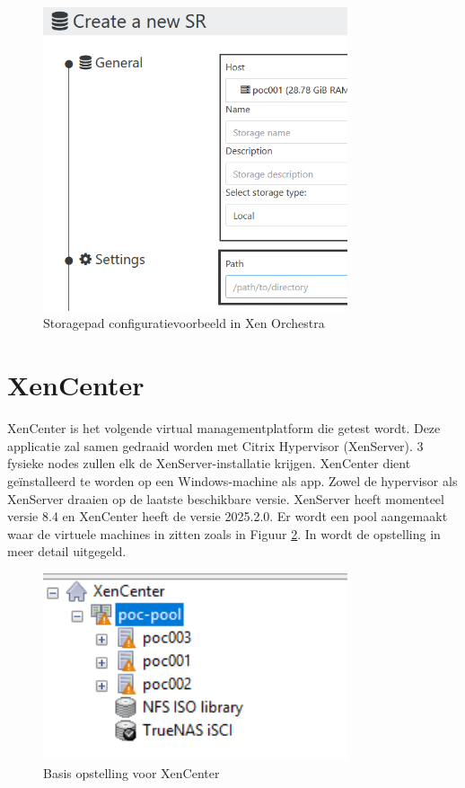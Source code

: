\begin{figure}[H]
  \centering
  \includegraphics[width=0.8\textwidth]{../poc/storage-path-orch.png}
  \caption{Storagepad configuratievoorbeeld in Xen Orchestra}
  \label{fig:storage-path-orch}  
\end{figure}
\section{XenCenter}%
XenCenter is het volgende virtual managementplatform die getest wordt. Deze applicatie zal samen gedraaid worden met Citrix Hypervisor (XenServer).
3 fysieke nodes zullen elk de XenServer-installatie krijgen. XenCenter dient geïnstalleerd te worden op een Windows-machine als app.
Zowel de hypervisor als XenServer draaien op de laatste beschikbare versie. XenServer heeft momenteel versie 8.4 en XenCenter heeft de versie 2025.2.0.
Er wordt een pool aangemaakt waar de virtuele machines in zitten zoals in Figuur \ref{fig:opstel-xen}.
In  wordt de opstelling in meer detail uitgegeld.
\begin{figure}[H]
\centering
\includegraphics[width=0.8\textwidth]{../poc/opstel-xen.png}
\caption{Basis opstelling voor XenCenter}
\label{fig:opstel-xen}
\end{figure}

